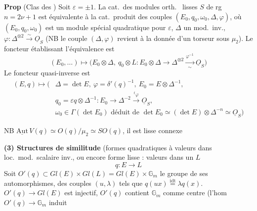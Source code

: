 \documentclass[11pt,a4paper]{article}
\begin{document}
\textbf{Prop} (Clas des ) Soit
$\varepsilon = \pm 1$. La cat.\ des modules orth.\  lisses 
$S$ de rg $n = 2\nu + 1$ est équivalente à la cat.\ produit des couples
$(E_0, q_0, \omega_0, \Delta, \varphi)$, où $(E_0, q_0, \omega_0)$ est un module
spécial quadratique pour $\varepsilon$, \struck{\ill{}} $\Delta$ un mod.\ inv.,
$\varphi : \Delta^{\otimes 2} \xrightarrow{\sim} \underline{O}_S$ (NB le couple
$(\Delta, \varphi)$ revient à la donnée d'un torseur sous $\mu_2$). Le foncteur
établissant l'équivalence est
\[
  (E_0, \ldots) \longmapsto \bigl(E_0 \otimes \Delta,\ q_0 \otimes L :
  E_0 \otimes \Delta \to \Delta^{\otimes 2} \xrightarrow[\sim]{\varphi^{-1}} \underline{O}_S\bigr)
\]
Le foncteur quasi-inverse est
\[
\begin{aligned}
  (E, q) \longmapsto \bigl(&\Delta = \det E,\ \varphi = \delta'(q)^{-1},\
  E_0 = E \otimes \Delta^{-1}, \\
  &q_0 = \varepsilon q \otimes \Delta^{-1} : E_0 \to \Delta^{-2}
  \xrightarrow{\ {}^t\varphi\ } \underline{O}_S, \\
  &\omega_0 \in \Gamma(\det E_0) \text{ déduit de }
  \det E_0 \simeq (\det E) \otimes \Delta^{-n} \simeq \underline{O}_S\bigr)
\end{aligned}
\]

NB $\underline{\mathrm{Aut}}\, V(q) \simeq O(q)/\mu_2 \simeq SO(q)$, il est lisse
connexe \add{réductif} \add{lisse}

\textbf{(3) Structures de similitude} (formes quadratiques à valeurs dans
loc.\ mod.\ scalaire inv., ou encore forme lisse : valeurs dans un $L$
\[
  q : E \longrightarrow L
\]
Soit $O'(q) \subset Gl(E) \times Gl(L) = Gl(E) \times \mathbb{G}_m$ le groupe de
ses automorphismes, \struck{il \ill{}} \struck{$SO(q)$} des couples $(u, \lambda)$
tels que $q(ux) \overset{\text{idt}}{=} \lambda q(x)$. $O'(q) \to Gl(E)$ est
injectif, $O'(q)$ contient $\mathbb{G}_m$ comme centre (l'hom
$O'(q) \to \mathbb{G}_m$ induit
\end{document}
